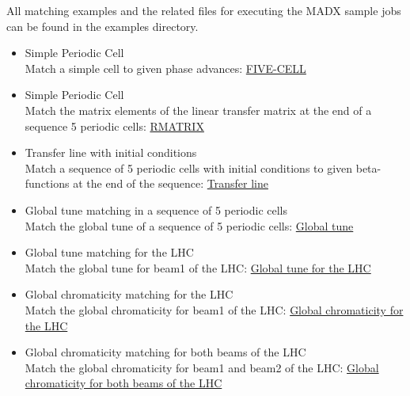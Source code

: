 All matching examples and the related files for executing the MADX
sample jobs can be found in the examples directory. 
\begin{itemize}
	\item Simple Periodic Cell\\
	Match a simple cell to given phase advances: 
        \href{http://cern.ch/madx/madX/examples/match/5cell/job.5cell.madx}{FIVE-CELL}

	\item Simple Periodic Cell\\
	Match the matrix elements of the linear transfer matrix at the
        end of a sequence 5 periodic cells:  
        \href{http://cern.ch/madx/madX/examples/match/r-matrix/job.r-matrix.madx}{RMATRIX}

	\item Transfer line with initial conditions\\
	Match a sequence of 5 periodic cells with initial conditions  to
        given beta-functions at the end of the sequence:  
        \href{http://cern.ch/madx/madX/examples/match/line/job.line.madx}{Transfer line}

	\item Global tune matching in a sequence of 5 periodic cells \\
	Match the global tune of a sequence of 5 periodic cells: 
        \href{http://cern.ch/madx/madX/examples/match/global-tune/job.global-tune.madx}{Global tune}
	
	\item Global tune matching for the LHC\\
	Match the global tune for beam1 of the LHC: 
        \href{http://cern.ch/madx/madX/examples/match/lhc.tune/job.lhc.tune.madx}{Global tune for the LHC}
	
	\item Global chromaticity matching for the LHC\\
	Match the global chromaticity for beam1 of the LHC: 
        \href{http://cern.ch/madx/madX/examples/match/lhc.chromaticity/job.lhc.chromaticity.madx}{Global
          chromaticity for the LHC} 

	\item Global chromaticity matching for both beams of the LHC\\
	Match the global chromaticity for beam1 and beam2 of the LHC: 
        \href{http://cern.ch/madx/madX/examples/match/lhc.2chromaticity/job.lhc.2chromaticity.madx}{Global
          chromaticity for both beams of the LHC} 
	

\end{itemize}

